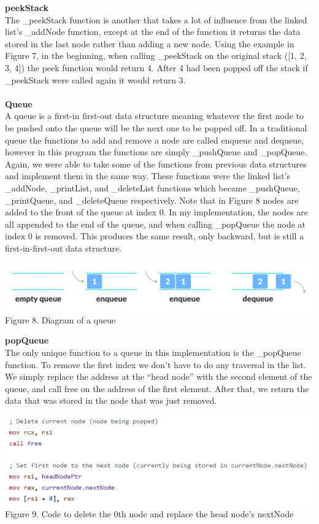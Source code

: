 \documentclass[twoside]{article}
\begin{document}
\noindent \textbf{\large peekStack} \\
\noindent The \_peekStack function is another that takes a lot of influence from the linked list’s \_addNode function, except at the end of the function it returns the data stored in the last node rather than adding a new node. Using the example in Figure 7, in the beginning, when calling \_peekStack on the original stack ([1, 2, 3, 4]) the peek function would return 4. After 4 had been popped off the stack if \_peekStack were called again it would return 3.\\\\


\noindent \textbf{\Large Queue} \\
\noindent A queue is a first-in first-out data structure meaning whatever the first node to be pushed onto the queue will be the next one to be popped off. In a traditional queue the functions to add and remove a node are called enqueue and dequeue, however in this program the functions are simply \_pushQueue and \_popQueue. Again, we were able to take some of the functions from previous data structures and implement them in the same way. These functions were the linked list’s \_addNode, \_printList, and \_deleteList functions which became \_pushQueue, \_printQueue, and \_deleteQueue respectively. Note that in Figure 8 nodes are added to the front of the queue at index 0. In my implementation, the nodes are all appended to the end of the queue, and when calling \_popQueue the node at index 0 is removed. This produces the same result, only backward, but is still a first-in-first-out data structure.
\begin{center}
    \includegraphics[width=.95\textwidth]{images/queueDiagram.png}\\
    Figure 8. Diagram of a queue
\end{center}

\noindent \textbf{\large popQueue} \\
\noindent The only unique function to a queue in this implementation is the \_popQueue function. To remove the first index we don’t have to do any traversal in the list. We simply replace the address at the “head node” with the second element of the queue, and call free on the address of the first element. After that, we return the data that was stored in the node that was just removed.
\begin{center}
    \includegraphics[width=.95\textwidth]{images/deleteNodeQueue.png}\\
    Figure 9. Code to delete the 0th node and replace the head node’s nextNode
\end{center}
\end{document}
